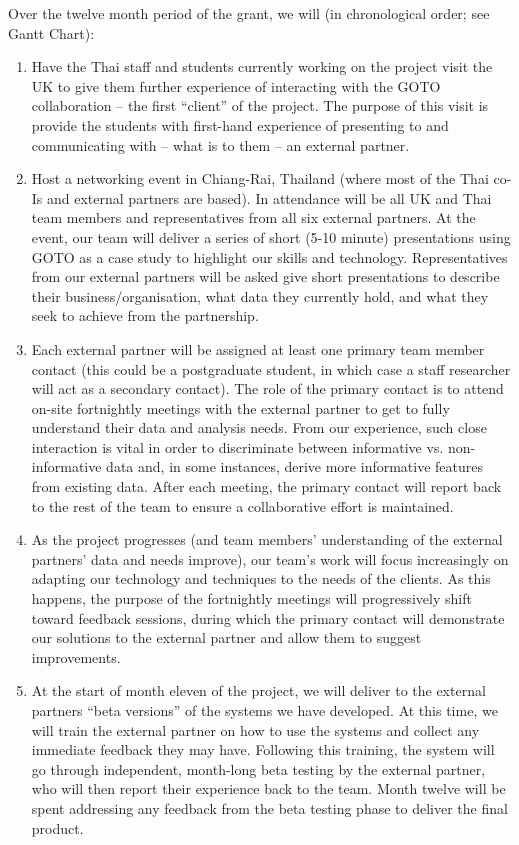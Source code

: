 \documentclass[11pt]{article}
\begin{document}
\noindent
Over the twelve month period of the grant, we will (in chronological order; see Gantt Chart):
\begin{enumerate}[leftmargin=6mm,itemsep=0pt,topsep=1pt]
\item Have the Thai staff and students currently working on the project visit the UK to give them further experience of interacting with the GOTO collaboration -- the first ``client'' of the project. The purpose of this visit is provide the students with first-hand experience of presenting to and communicating with -- what is to them -- an external partner.
\item Host a networking event in Chiang-Rai, Thailand (where most of the Thai co-Is and external partners are based). In attendance will be all UK and Thai team members and representatives from all six external partners. At the event, our team will deliver a series of short (5-10 minute) presentations using GOTO as a case study to highlight our skills and technology. Representatives from our external partners will be asked give short presentations to describe their business/organisation, what data they currently hold, and what they seek to achieve from the partnership.  
\item Each external partner will be assigned at least one primary team member contact (this could be a postgraduate student, in which case a staff researcher will act as a secondary contact). The role of the primary contact is to attend on-site fortnightly meetings with the external partner to get to fully understand their data and analysis needs. From our experience, such close interaction is vital in order to discriminate between informative vs. non-informative data and, in some instances, derive more informative features from existing data. After each meeting, the primary contact will report back to the rest of the team to ensure a collaborative effort is maintained.
\item As the project progresses (and team members' understanding of the external partners' data and needs improve), our team's work will focus increasingly on adapting our technology and techniques to the needs of the clients. As this happens, the purpose of the fortnightly meetings will progressively shift toward feedback sessions, during which the primary contact will demonstrate our solutions to the external partner and allow them to suggest improvements. 
\item At the start of month eleven of the project, we will deliver to the external partners ``beta versions'' of the systems we have developed. At this time, we will train the external partner on how to use the systems and collect any immediate feedback they may have. Following this training, the system will go through independent, month-long beta testing by the external partner, who will then report their experience back to the team. Month twelve will be spent addressing any feedback from the beta testing phase to deliver the final product.
\end{enumerate}
\end{document}
